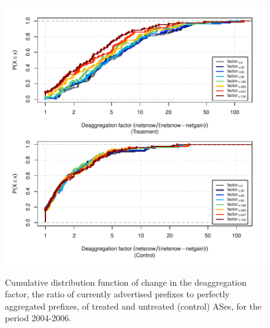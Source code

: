 \clearpage
\vspace*{1.25em}
\begin{figure}[H]
\begin{centering}
\begin{singlespace}
\captionsetup{list=no}
    \includegraphics[width=6in]
    {figures/behavior-deagg_factor-2004_2006-corr.pdf}
    \vspace{-2em}\\
    \caption{Cumulative distribution function of change in the deaggregation
    factor, the ratio of currently advertised prefixes to perfectly aggregated
    prefixes, of treated and untreated (control) ASes, for the period
    2004-2006.}
\end{singlespace}
\end{centering}
\end{figure}

